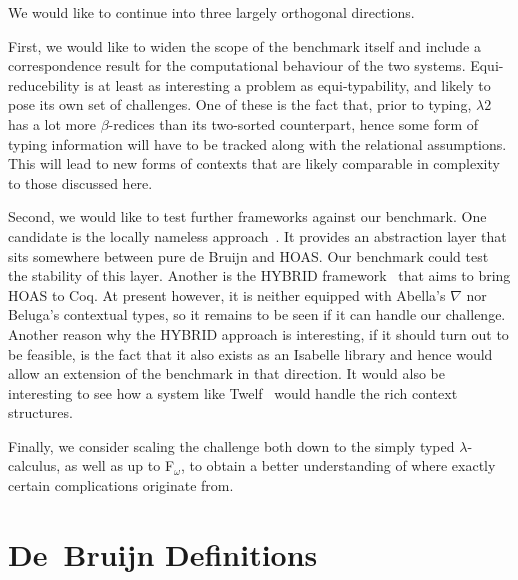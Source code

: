 \documentclass[a4paper,UKenglish]{lipics-v2016}
\newcommand{\SysL}{$\lambda2$\xspace}
\theoremstyle{plain}
\begin{document}
We would like to continue into three largely orthogonal directions.

First, we would like to widen the scope of the benchmark itself and include a correspondence result for the computational behaviour of the two systems.
Equi-reducebility is at least as interesting a problem as equi-typability, and likely to pose its own set of challenges.
One of these is the fact that, prior to typing, \SysL has a lot more $\beta$-redices than its two-sorted counterpart, hence some form of typing information will have to be tracked along with the relational assumptions.
This will lead to new forms of contexts that are likely comparable in complexity to those discussed here.

Second, we would like to test further frameworks against our benchmark.
One candidate is the locally nameless approach~\cite{DBLP:conf/popl/AydemirCPPW08}.
It provides an abstraction layer that sits somewhere between pure de Bruijn and HOAS.
Our benchmark could test the stability of this layer.
Another is the HYBRID framework~\cite{DBLP:journals/jar/FeltyM12} that aims to bring HOAS to Coq.
At present however, it is neither equipped with Abella's $\nabla$ nor Beluga's contextual types, so it remains to be seen if it can handle our challenge.
Another reason why the HYBRID approach is interesting, if it should turn out to be feasible, is the fact that it also exists as an Isabelle library and hence would allow an extension of the benchmark in that direction.
It would also be interesting to see how a system like Twelf~\cite{DBLP:conf/cade/PfenningS99} would handle the rich context structures.

Finally, we consider scaling the challenge both down to the simply typed $\lambda$-calculus, as well as up to F$_\omega$, to obtain a better understanding of where exactly certain complications originate from.

\appendix

\section{De~Bruijn Definitions}
\label{apdx:db}
\end{document}
